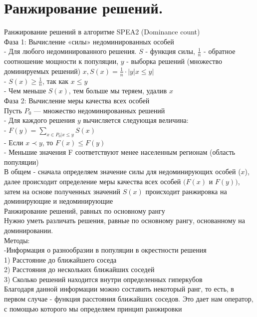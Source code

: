 \section{Ранжирование решений.}
Ранжирование решений в алгоритме SPEA2 (Dominance count)\\
Фаза 1: Вычисление «силы» недоминированных особей\\

- Для любого недоминированного решения. $S$ - функция силы, $\frac{1}{n}$ - обратное соотношение мощности к популяции, $y$ - выборка решений (множество доминируемых решений) $x, S(x) = \frac{1}{n}·|{y | x ≤ y}|$\\
- $S(x) ≥ \frac{1}{n}$, так как $x ≤ y$\\
- Чем меньше $S(x)$, тем больше мы теряем, удалив $x$\\

Фаза 2: Вычисление меры качества всех особей\\
Пусть $P_{0}$ — множество недоминированных решений\\
- Для каждого решения $y$ вычисляется следующая величина:\\
- $F(y) = \sum_{x ∈ P_{0}|x≤y} S(x)$\\
- Если $x ≺ y$, то $F(x) ≤ F(y)$\\
- Меньшие значения F соответствуют менее населенным регионам (область популяции)\\

В общем - сначала определяем значение силы для недоминирующих особей ($x$), далее происходит определение меры качества всех особей $(F(x)$ и $F(y))$, затем на основе полученных значений $S(x)$ происходит ранжировка на доминирующие и недоминирующие\\

Ранжирование решений, равных по основному рангу\\

Нужно уметь различать решения, равные по основному рангу,
основанному на доминировании.\\

Методы:\\
-Информация о разнообразии в популяции в окрестности решения\\
1) Расстояние до ближайшего соседа\\
2) Расстояния до нескольких ближайших соседей\\
3) Сколько решений находится внутри определенных гиперкубов\\
Благодаря данной информации можно составить некоторый ранг, то есть, в первом случае - функция расстояния ближайших соседов. Это дает нам оператор, с помощью которого мы определяем принцип ранжировки\\


